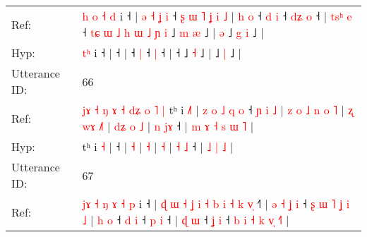 \documentclass[10pt]{article}
\DeclareRobustCommand{\hl}[1]{{\textcolor{red}{#1}}}
\begin{document}
\begin{longtable}{ll}
Ref: & \hl{h}\hl{ }\hl{o}\hl{ }\hl{˧}\hl{ }\hl{d} i ˧ |\hl{ }\hl{ə}\hl{ }\hl{˧}\hl{ }\hl{ʝ}\hl{ }\hl{i} ˧\hl{ }\hl{ʂ}\hl{ }\hl{ɯ}\hl{ }\hl{˥}\hl{ }\hl{ʝ}\hl{ }\hl{i}\hl{ }\hl{˩} |\hl{ }\hl{h}\hl{ }\hl{o} ˧\hl{ }\hl{d} \hl{i} ˧\hl{ }\hl{d}\hl{ʑ} \hl{o} ˧ |\hl{ }\hl{t}\hl{s}\hl{ʰ}\hl{ }\hl{e} ˧\hl{ }\hl{t}\hl{ɕ}\hl{ }\hl{ɯ}\hl{ }\hl{˩}\hl{ }\hl{h}\hl{ }\hl{ɯ}\hl{ }\hl{˩}\hl{ }\hl{ɲ}\hl{ }\hl{i} ˩\hl{ }\hl{m} \hl{æ} ˩ |\hl{ }\hl{ə} ˩\hl{ }\hl{g} \hl{i} ˩ |
 \\
Hyp: & \hl{}\hl{}\hl{}\hl{}\hl{}\hl{t}\hl{ʰ} i ˧ |\hl{}\hl{}\hl{}\hl{}\hl{}\hl{}\hl{}\hl{} ˧\hl{}\hl{}\hl{}\hl{}\hl{}\hl{}\hl{}\hl{}\hl{}\hl{}\hl{}\hl{} |\hl{}\hl{}\hl{}\hl{} ˧\hl{}\hl{} \hl{|} ˧\hl{}\hl{}\hl{} \hl{|} ˧ |\hl{}\hl{}\hl{}\hl{}\hl{}\hl{} ˧\hl{}\hl{}\hl{}\hl{}\hl{}\hl{}\hl{}\hl{}\hl{}\hl{}\hl{}\hl{}\hl{}\hl{}\hl{}\hl{}\hl{} ˩\hl{}\hl{} \hl{˧} ˩ |\hl{}\hl{} ˩\hl{}\hl{} \hl{|} ˩ |
 \\
\midrule
Utterance ID: & 66 \\
Ref: & \hl{j}\hl{ɤ}\hl{ }\hl{˧}\hl{ }\hl{ŋ}\hl{ }\hl{ɤ}\hl{ }\hl{˧}\hl{ }\hl{d}\hl{ʑ}\hl{ }\hl{o}\hl{ }\hl{˥}\hl{ }\hl{|}\hl{ }tʰ i \hl{˩}\hl{˥} |\hl{ }\hl{z}\hl{ }\hl{o}\hl{ }\hl{˩}\hl{ }\hl{q}\hl{ }\hl{o} ˧\hl{ }\hl{ɲ}\hl{ }\hl{i}\hl{ }\hl{˩} |\hl{ }\hl{z}\hl{ }\hl{o}\hl{ }\hl{˩}\hl{ }\hl{n}\hl{ }\hl{o} \hl{˥} |\hl{ }\hl{ʐ}\hl{ }\hl{w}\hl{ɤ} \hl{˩}\hl{˥} |\hl{ }\hl{d}\hl{ʑ}\hl{ }\hl{o} \hl{˩} | \hl{n} \hl{j}\hl{ɤ} ˧ |\hl{ }\hl{m}\hl{ }\hl{ɤ}\hl{ }\hl{˧} \hl{s} \hl{ɯ} \hl{˥} |
 \\
Hyp: & \hl{}\hl{}\hl{}\hl{}\hl{}\hl{}\hl{}\hl{}\hl{}\hl{}\hl{}\hl{}\hl{}\hl{}\hl{}\hl{}\hl{}\hl{}\hl{}\hl{}tʰ i \hl{}\hl{˧} |\hl{}\hl{}\hl{}\hl{}\hl{}\hl{}\hl{}\hl{}\hl{}\hl{} ˧\hl{}\hl{}\hl{}\hl{}\hl{}\hl{} |\hl{}\hl{}\hl{}\hl{}\hl{}\hl{}\hl{}\hl{}\hl{}\hl{} \hl{˧} |\hl{}\hl{}\hl{}\hl{}\hl{} \hl{}\hl{˧} |\hl{}\hl{}\hl{}\hl{}\hl{} \hl{˧} | \hl{˧} \hl{}\hl{˩} ˧ |\hl{}\hl{}\hl{}\hl{}\hl{}\hl{} \hl{˩} \hl{|} \hl{˩} |
 \\
\midrule
Utterance ID: & 67 \\
Ref: & \hl{j}\hl{ɤ}\hl{ }\hl{˧}\hl{ }\hl{ŋ}\hl{ }\hl{ɤ}\hl{ }\hl{˧}\hl{ }\hl{p} i ˧ |\hl{ }\hl{ɖ}\hl{ }\hl{ɯ}\hl{ }\hl{˧}\hl{ }\hl{ʝ}\hl{ }\hl{i}\hl{ }\hl{˧}\hl{ }\hl{b}\hl{ }\hl{i}\hl{ }\hl{˧}\hl{ }\hl{k}\hl{ }\hl{v}\hl{̩} ˧\hl{˥} |\hl{ }\hl{ə}\hl{ }\hl{˧}\hl{ }\hl{ʝ}\hl{ }\hl{i} ˧\hl{ }\hl{ʂ}\hl{ }\hl{ɯ}\hl{ }\hl{˥}\hl{ }\hl{ʝ}\hl{ }\hl{i}\hl{ }\hl{˩} |\hl{ }\hl{h}\hl{ }\hl{o} ˧\hl{ }\hl{d} \hl{i} ˧\hl{ }\hl{p} \hl{i} ˧ |\hl{ }\hl{ɖ}\hl{ }\hl{ɯ} ˧\hl{ }\hl{ʝ} \hl{i} ˧\hl{ }\hl{b} \hl{i} \hl{˧} \hl{k} \hl{v}\hl{̩} \hl{˧}\hl{˥} |

\end{longtable}
\end{document}
